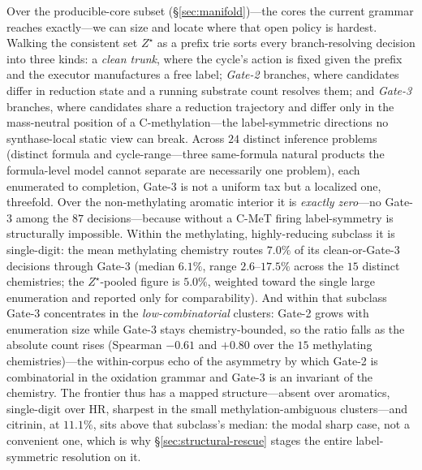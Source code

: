 \documentclass[11pt]{article}
\theoremstyle{definition}
\newcommand{\zstar}{\ensuremath{Z^{\star}}}
\begin{document}
Over the producible-core subset (\S\ref{sec:manifold})---the cores the current grammar reaches
exactly---we can size and locate where that open policy is hardest. Walking the consistent set
\zstar{} as a prefix trie sorts every branch-resolving decision into three kinds: a \emph{clean
trunk}, where the cycle's action is fixed given the prefix and the executor manufactures a free
label; \emph{Gate-2} branches, where candidates differ in reduction state and a running substrate
count resolves them; and \emph{Gate-3} branches, where candidates share a reduction trajectory and
differ only in the mass-neutral position of a C-methylation---the label-symmetric directions no
synthase-local static view can break. Across $24$ distinct inference problems (distinct formula and
cycle-range---three same-formula natural products the formula-level model cannot separate are
necessarily one problem), each enumerated to completion, Gate-3 is not a uniform tax but a localized
one, threefold. Over the non-methylating aromatic interior it is \emph{exactly zero}---no Gate-3
among the $87$ decisions---because without a C-MeT firing label-symmetry is structurally impossible.
Within the methylating, highly-reducing subclass it is single-digit: the mean methylating chemistry
routes $7.0\%$ of its clean-or-Gate-3 decisions through Gate-3 (median $6.1\%$, range $2.6$--$17.5\%$
across the $15$ distinct chemistries; the \zstar-pooled figure is $5.0\%$, weighted toward the single
large enumeration and reported only for comparability). And within that subclass Gate-3 concentrates
in the \emph{low-combinatorial} clusters: Gate-2 grows with enumeration size while Gate-3 stays
chemistry-bounded, so the ratio falls as the absolute count rises (Spearman $-0.61$ and $+0.80$ over
the $15$ methylating chemistries)---the within-corpus echo of the asymmetry by which Gate-2 is
combinatorial in the oxidation grammar and Gate-3 is an invariant of the chemistry. The frontier thus
has a mapped structure---absent over aromatics, single-digit over HR, sharpest in the small
methylation-ambiguous clusters---and citrinin, at $11.1\%$, sits above that subclass's median: the
modal sharp case, not a convenient one, which is why \S\ref{sec:structural-rescue} stages the entire
label-symmetric resolution on it.
\end{document}
